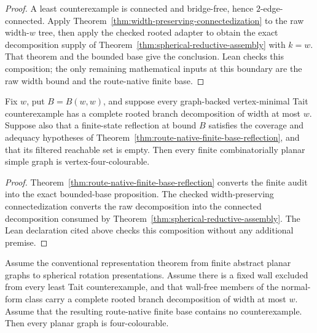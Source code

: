 \begin{proof}
A least counterexample is connected and bridge-free, hence
$2$-edge-connected.  Apply
Theorem~\ref{thm:width-preserving-connectedization} to the raw width-$w$
tree, then apply the checked rooted adapter to obtain the exact decomposition
supply of Theorem~\ref{thm:spherical-reductive-assembly} with $k=w$.  That
theorem and the bounded base give the conclusion.  Lean checks this
composition; the only remaining mathematical inputs at this boundary are
the raw width bound and the route-native finite base.
\end{proof}

\begin{corollary}
\label{cor:factored-bounded-width-reflection-assembly}
Fix \(w\), put \(B=B(w,w)\), and suppose every graph-backed
vertex-minimal Tait counterexample has a complete rooted branch decomposition
of width at most \(w\).  Suppose also that a finite-state reflection at
bound \(B\) satisfies the coverage and adequacy hypotheses of
Theorem~\ref{thm:route-native-finite-base-reflection}, and that its filtered
reachable set is empty.  Then every finite combinatorially planar simple
graph is vertex-four-colourable.
\end{corollary}

\begin{proof}
Theorem~\ref{thm:route-native-finite-base-reflection} converts the finite
audit into the exact bounded-base proposition.  The checked
width-preserving connectedization converts the raw decomposition into the
connected decomposition consumed by
Theorem~\ref{thm:spherical-reductive-assembly}.  The Lean declaration cited
above checks this composition without any additional premise.
\end{proof}

\begin{corollary}
\label{cor:wall-exclusion-assembly}
Assume the conventional representation theorem from finite abstract planar
graphs to spherical rotation presentations.  Assume there is a fixed wall
excluded from every least Tait counterexample, and that wall-free members
of the normal-form class carry a complete rooted branch decomposition of
width at most $w$.  Assume that the resulting route-native finite base
contains no counterexample.  Then every planar graph is four-colourable.
\end{corollary}


